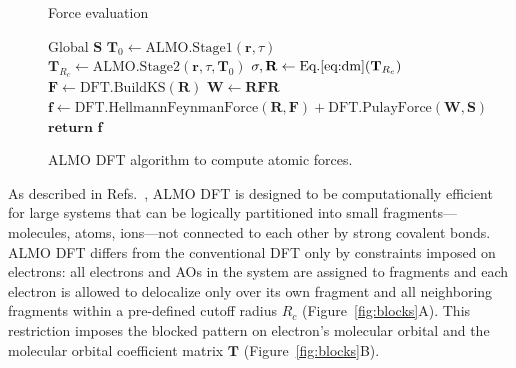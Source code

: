 \documentclass[aip,jcp,reprint,amsmath,amssymb]{revtex4-1}
\begin{document}
\begin{figure}
\begin{algorithm}[H]
  \caption{Force evaluation}
  \label{alg:force}
   \begin{algorithmic}[1]
   	\State Global $\mathbf{S}$ 
	\State $\mathbf{T}_0 \gets \text{ALMO.Stage1}(\mathbf{r}, \tau)$ 
	\State $\mathbf{T}_{R_c} \gets \text{ALMO.Stage2}(\mathbf{r}, \tau, \mathbf{T}_0)$ 
	\State $\mathbf{\sigma}, \mathbf{R} \gets \text{Eq.}\ref{eq:dm}(\mathbf{T}_{R_c})$ 
	\State $\mathbf{F} \gets \text{DFT.BuildKS}(\mathbf{R})$ 
	\State $\mathbf{W} \gets \mathbf{RFR}$ 
	\State $\mathbf{f} \gets \text{DFT.HellmannFeynmanForce}(\mathbf{R},\mathbf{F}) + \text{DFT.PulayForce}(\mathbf{W},\mathbf{S}) $ 
	\State $\mathbf{return}$ $\mathbf{f}$
	\EndProcedure
   \end{algorithmic}
\end{algorithm}
\caption{\label{fig:force} ALMO DFT algorithm to compute atomic forces.}
\end{figure}


As described in Refs.~, ALMO DFT is designed to be computationally efficient for large systems that can be logically partitioned into small fragments---molecules, atoms, ions---not connected to each other by strong covalent bonds. ALMO DFT differs from the conventional DFT only by constraints imposed on electrons: all electrons and AOs in the system are assigned to fragments and each electron is allowed to delocalize only over its own fragment and all neighboring fragments within a pre-defined cutoff radius $R_c$ (Figure~\ref{fig:blocks}A). This restriction imposes the blocked pattern on electron's molecular orbital and the molecular orbital coefficient matrix $\mathbf{T}$ (Figure~\ref{fig:blocks}B).
\end{document}
